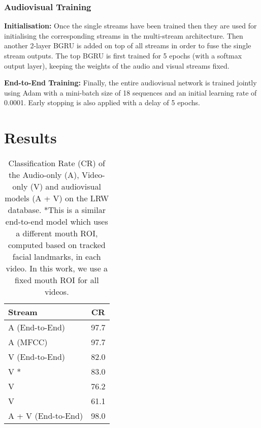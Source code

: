 \documentclass{article}
\begin{document}
\subsubsection{Audiovisual Training} 

\textbf{Initialisation:} Once the single streams have been trained then they are used for initialising the corresponding streams in the multi-stream architecture. Then another 2-layer BGRU is added on top of all streams in order to fuse the single stream outputs. The top BGRU is first trained for 5 epochs (with a softmax output layer), keeping the weights of the audio and visual streams fixed.

\noindent
\textbf{End-to-End Training:} Finally, the entire audiovisual network is trained jointly using Adam with a mini-batch size of 18 sequences and an initial learning rate of 0.0001. Early stopping is also applied with a delay of 5 epochs.





\section{Results}

\begin{table}[t]
\renewcommand{\arraystretch}{1.1}
\renewcommand{\tabcolsep}{7pt}
\caption{ Classification Rate  (CR) of the  Audio-only  (A), Video-only  (V) and audiovisual models (A + V) on the LRW database. *This is a similar end-to-end model which uses a different mouth ROI, computed based on tracked facial landmarks, in each video. In this work, we use a fixed mouth ROI for all videos.  }
\label{tab:resultsBBC}
\centering
\begin{tabular}{lc}
\toprule  Stream &   CR   \\

\midrule A (End-to-End)  &  97.7     \\
A (MFCC) & 97.7 \\
V (End-to-End) & 82.0\\
V \cite{stafylakis2017combining}* & 83.0\\
V \cite{chung2016lipSentences} & 76.2 \\
V \cite{chung2016lip} & 61.1 \\
A + V (End-to-End)  & 98.0  \\

\bottomrule

\end{tabular} 

\end{table}
\end{document}

